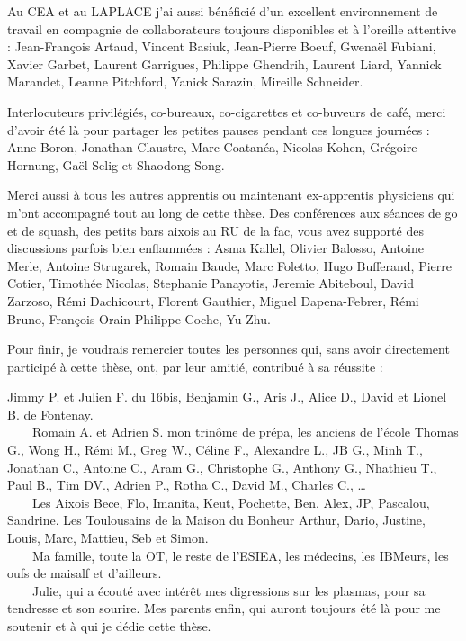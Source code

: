 Au CEA et au LAPLACE j’ai aussi bénéficié d’un excellent
environnement de travail en compagnie de collaborateurs toujours disponibles et
à l'oreille attentive :
Jean-François Artaud, Vincent Basiuk,
Jean-Pierre Boeuf,
Gwenaël Fubiani,
Xavier Garbet,
Laurent Garrigues,
Philippe Ghendrih, 
Laurent Liard,
Yannick Marandet,
Leanne Pitchford,
Yanick Sarazin,
Mireille Schneider. 


Interlocuteurs privilégiés, co-bureaux, co-cigarettes et co-buveurs de café,
merci d'avoir été là pour partager les petites pauses pendant ces longues
journées :
Anne Boron, Jonathan Claustre, Marc Coatanéa, Nicolas Kohen, Grégoire Hornung, Gaël Selig et Shaodong Song.

Merci aussi à tous les autres apprentis ou maintenant ex-apprentis physiciens
qui m'ont accompagné tout au long de cette thèse. Des conférences aux séances de
go et de squash, des petits bars aixois au RU de la fac, vous avez supporté des
discussions parfois bien enflammées : Asma Kallel, Olivier Balosso, Antoine
Merle, Antoine Strugarek,
Romain Baude,
Marc Foletto,
Hugo Bufferand,
Pierre Cotier,
Timothée Nicolas,
Stephanie Panayotis,
Jeremie Abiteboul,
David Zarzoso,
Rémi Dachicourt,
Florent Gauthier,
Miguel Dapena-Febrer,
Rémi Bruno,
François Orain
Philippe Coche,
Yu Zhu.

Pour finir, je voudrais remercier toutes les personnes qui, sans avoir
directement participé à cette thèse, ont, par leur amitié, contribué à sa
réussite : 


Jimmy P. et Julien F. du 16bis, Benjamin
G., Aris J., Alice D., David et Lionel B. de Fontenay.
\\
\mbox{~~~~}Romain A. et Adrien S.
mon trinôme de prépa, les anciens de l'école Thomas G., Wong H., Rémi M., Greg
W., Céline F., Alexandre L., JB G., Minh T., Jonathan C., Antoine C., Aram G., Christophe G., Anthony G., Nhathieu T., Paul B., Tim DV., Adrien P., Rotha C.,
David M., Charles C., \ldots
\\
\mbox{~~~~}Les Aixois Bece, Flo, Imanita, Keut, Pochette,
Ben, Alex, JP, Pascalou, Sandrine. Les Toulousains de la
Maison du Bonheur Arthur, Dario, Justine, Louis, Marc, Mattieu, Seb et
Simon.
\\
\mbox{~~~~}Ma famille, toute la OT, le reste de l'ESIEA, les médecins, les
IBMeurs, les oufs de maisalf et d'ailleurs.
\\
\mbox{~~~~}Julie, qui a écouté avec intérêt mes digressions sur les plasmas,
pour sa tendresse et son sourire.
Mes parents enfin, qui auront toujours été là pour me soutenir et à qui je dédie
cette thèse.



